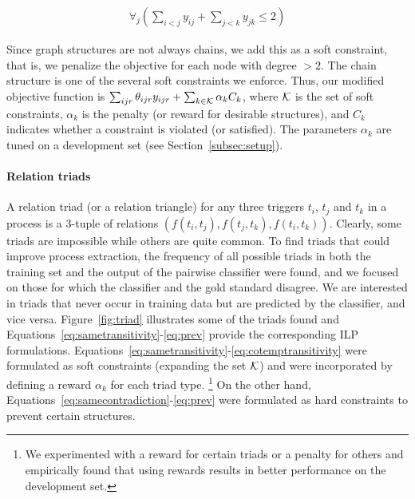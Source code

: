 \begin{align}
\forall_j (\sum_{i<j} y_{ij} + \sum_{j<k} y_{jk} \leq 2)
\end{align}

Since graph structures are not always chains, we add this as a soft constraint, that is, we penalize the objective for each node with degree $>2$. The chain structure is one of the several soft constraints we enforce. Thus, our modified objective function is $\sum_{ijr} \theta_{ijr} y_{ijr} + \sum_{k \in \mathcal{K}} \alpha_k C_k$, where $\mathcal{K}$ is the set of soft constraints, $\alpha_k$ is the penalty (or reward for desirable structures), and $C_k$ indicates whether a constraint is violated (or satisfied). The parameters $\alpha_k$ are tuned on a development set (see Section~\ref{subsec:setup}).

\paragraph{Relation triads} 
A relation triad (or a relation triangle) for any three triggers $t_{i}$, $t_{j}$ and $t_{k}$ in a process is a 3-tuple of relations $(f(t_i, t_j),f(t_j, t_k),f(t_i, t_k))$. Clearly, some triads are impossible while others are quite common. To find triads that could improve process extraction, the frequency of all possible triads in both the training set and the output of the pairwise classifier were found, and we focused on those for which the classifier and the gold standard disagree. We are interested in triads that never occur in training data but are predicted by the classifier, and vice versa. Figure~\ref{fig:triad} illustrates some of the triads found and Equations~\ref{eq:sametransitivity}-\ref{eq:prev} provide the corresponding ILP formulations. Equations~\ref{eq:sametransitivity}-\ref{eq:cotemptransitivity} were formulated as soft constraints (expanding the set $\mathcal{K}$) and were incorporated by defining a reward $\alpha_k$ for each triad type. \footnote{We experimented with a reward for certain triads or a penalty for others and empirically found that using rewards results in better performance on the development set.} On the other hand, Equations~\ref{eq:samecontradiction}-\ref{eq:prev} were formulated as hard constraints to prevent certain structures.

